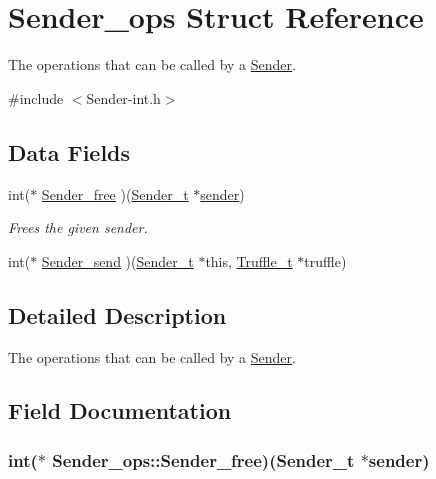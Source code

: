 \hypertarget{struct_sender__ops}{\section{Sender\-\_\-ops Struct Reference}
\label{struct_sender__ops}
}


The operations that can be called by a \hyperlink{struct_sender}{Sender}.  




{\ttfamily \#include $<$Sender-\/int.\-h$>$}

\subsection*{Data Fields}
\begin{DoxyCompactItemize}
\item 
int($\ast$ \hyperlink{struct_sender__ops_a6dca3c0902479ba07947a9d2adb361ef}{Sender\-\_\-free} )(\hyperlink{struct_sender}{Sender\-\_\-t} $\ast$\hyperlink{spp__profinet_8c_a6aa2b3eed1dbaeff6fd73bd762ed09b4}{sender})
\begin{DoxyCompactList}\small\item\em Frees the given sender. \end{DoxyCompactList}\item 
int($\ast$ \hyperlink{struct_sender__ops_a770fd3ebe41dcd7fd5e8f84eb25a888a}{Sender\-\_\-send} )(\hyperlink{struct_sender}{Sender\-\_\-t} $\ast$this, \hyperlink{struct_truffle}{Truffle\-\_\-t} $\ast$truffle)
\end{DoxyCompactItemize}


\subsection{Detailed Description}
The operations that can be called by a \hyperlink{struct_sender}{Sender}. 

\subsection{Field Documentation}
\hypertarget{struct_sender__ops_a6dca3c0902479ba07947a9d2adb361ef}{
\subsubsection[{Sender\-\_\-free}]{\setlength{\rightskip}{0pt plus 5cm}int($\ast$ Sender\-\_\-ops\-::\-Sender\-\_\-free)({\bf Sender\-\_\-t} $\ast${\bf sender})}}\label{struct_sender__ops_a6dca3c0902479ba07947a9d2adb361ef}



